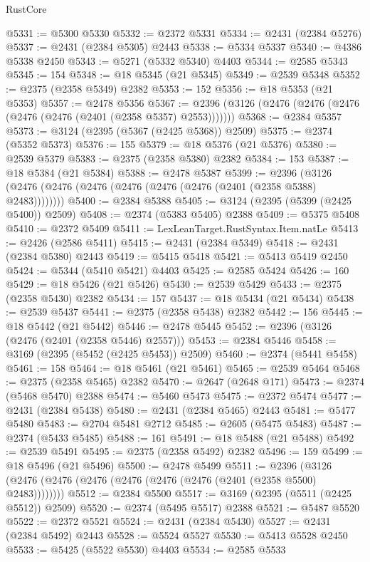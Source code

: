 \begin{lexlean}{RustCore}
\begin{coremodule}
@5331 := @5300 @5330
@5332 := @2372 @5331
@5334 := @2431 (@2384 @5276)
@5337 := @2431 (@2384 @5305) @2443
@5338 := @5334 @5337
@5340 := @4386 @5338 @2450
@5343 := @5271 (@5332 @5340) @4403
@5344 := @2585 @5343
@5345 := 154
@5348 := @18 @5345 (@21 @5345)
@5349 := @2539 @5348
@5352 := @2375 (@2358 @5349) @2382
@5353 := 152
@5356 := @18 @5353 (@21 @5353)
@5357 := @2478 @5356
@5367 := @2396 (@3126 (@2476 (@2476 (@2476 (@2476 (@2476 (@2401 (@2358 @5357) @2553)))))))
@5368 := @2384 @5357
@5373 := @3124 (@2395 (@5367 (@2425 @5368)) @2509)
@5375 := @2374 (@5352 @5373)
@5376 := 155
@5379 := @18 @5376 (@21 @5376)
@5380 := @2539 @5379
@5383 := @2375 (@2358 @5380) @2382
@5384 := 153
@5387 := @18 @5384 (@21 @5384)
@5388 := @2478 @5387
@5399 := @2396 (@3126 (@2476 (@2476 (@2476 (@2476 (@2476 (@2476 (@2401 (@2358 @5388) @2483))))))))
@5400 := @2384 @5388
@5405 := @3124 (@2395 (@5399 (@2425 @5400)) @2509)
@5408 := @2374 (@5383 @5405) @2388
@5409 := @5375 @5408
@5410 := @2372 @5409
@5411 := LexLeanTarget.RustSyntax.Item.natLe
@5413 := @2426 (@2586 @5411)
@5415 := @2431 (@2384 @5349)
@5418 := @2431 (@2384 @5380) @2443
@5419 := @5415 @5418
@5421 := @5413 @5419 @2450
@5424 := @5344 (@5410 @5421) @4403
@5425 := @2585 @5424
@5426 := 160
@5429 := @18 @5426 (@21 @5426)
@5430 := @2539 @5429
@5433 := @2375 (@2358 @5430) @2382
@5434 := 157
@5437 := @18 @5434 (@21 @5434)
@5438 := @2539 @5437
@5441 := @2375 (@2358 @5438) @2382
@5442 := 156
@5445 := @18 @5442 (@21 @5442)
@5446 := @2478 @5445
@5452 := @2396 (@3126 (@2476 (@2401 (@2358 @5446) @2557)))
@5453 := @2384 @5446
@5458 := @3169 (@2395 (@5452 (@2425 @5453)) @2509)
@5460 := @2374 (@5441 @5458)
@5461 := 158
@5464 := @18 @5461 (@21 @5461)
@5465 := @2539 @5464
@5468 := @2375 (@2358 @5465) @2382
@5470 := @2647 (@2648 @171)
@5473 := @2374 (@5468 @5470) @2388
@5474 := @5460 @5473
@5475 := @2372 @5474
@5477 := @2431 (@2384 @5438)
@5480 := @2431 (@2384 @5465) @2443
@5481 := @5477 @5480
@5483 := @2704 @5481 @2712
@5485 := @2605 (@5475 @5483)
@5487 := @2374 (@5433 @5485)
@5488 := 161
@5491 := @18 @5488 (@21 @5488)
@5492 := @2539 @5491
@5495 := @2375 (@2358 @5492) @2382
@5496 := 159
@5499 := @18 @5496 (@21 @5496)
@5500 := @2478 @5499
@5511 := @2396 (@3126 (@2476 (@2476 (@2476 (@2476 (@2476 (@2476 (@2401 (@2358 @5500) @2483))))))))
@5512 := @2384 @5500
@5517 := @3169 (@2395 (@5511 (@2425 @5512)) @2509)
@5520 := @2374 (@5495 @5517) @2388
@5521 := @5487 @5520
@5522 := @2372 @5521
@5524 := @2431 (@2384 @5430)
@5527 := @2431 (@2384 @5492) @2443
@5528 := @5524 @5527
@5530 := @5413 @5528 @2450
@5533 := @5425 (@5522 @5530) @4403
@5534 := @2585 @5533

\end{coremodule}
\end{lexlean}
